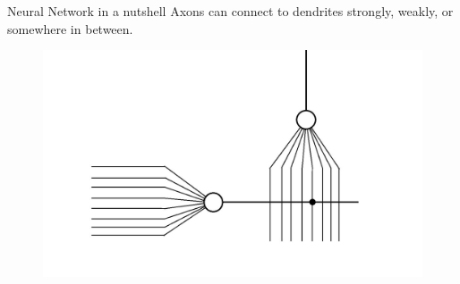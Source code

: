 \documentclass[10pt]{beamer}
\begin{document}
	\begin{frame}[c]{Neural Network in a nutshell}
		\large{Axons can connect to dendrites strongly, weakly, or somewhere in between.}
		\begin{figure}
			\includegraphics[width=0.9\linewidth]{images/sonn4}
		\end{figure}
	\end{frame}
\end{document}
